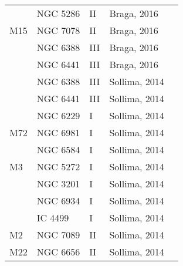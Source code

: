\documentclass[]{article}
\begin{document}
\begin{longtable}{
	p{1.5cm}|
	p{2.5cm}|
	p{2.5cm}|
	p{3.7cm}|
	p{5.5cm}
	@{}}
		& NGC 5286     & II         & Braga, 2016          &                                                                        \\
		M15            & NGC 7078     & II         & Braga, 2016          &                                                                        \\
		& NGC 6388     & III        & Braga, 2016          &                                                                        \\
		& NGC 6441     & III        & Braga, 2016          &                                                                        \\
		& NGC 6388     & III        & Sollima, 2014 \cite{sollima_2014}        &                                                                        \\
		& NGC 6441     & III        & Sollima, 2014        &                                                                        \\
		& NGC 6229     & I          & Sollima, 2014        &                                                                        \\
		M72            & NGC 6981     & I          & Sollima, 2014        &                                                                        \\
		& NGC 6584     & I          & Sollima, 2014        &                                                                        \\
		M3             & NGC 5272     & I          & Sollima, 2014        &                                                                        \\
		& NGC 3201     & I          & Sollima, 2014        &                                                                        \\
		& NGC 6934     & I          & Sollima, 2014        &                                                                        \\
		& IC 4499      & I          & Sollima, 2014        &                                                                        \\
		M2             & NGC 7089     & II         & Sollima, 2014        &                                                                        \\
		M22            & NGC 6656     & II         & Sollima, 2014        &                                                                        \\

\end{longtable}
\end{document}
